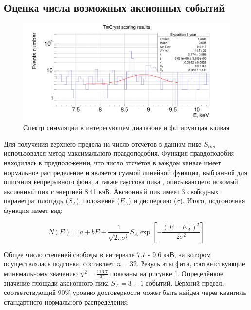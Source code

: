 \documentclass[a4paper,article,14pt]{extarticle}
\begin{document}
\subsection{Оценка числа возможных аксионных событий}

%
\begin{figure}[h!]
    \centering
    \includegraphics[width = \textwidth]{AxionFit.png}
    \caption{Спектр симуляции в интересующем диапазоне и фитирующая кривая}
   \label{AxionFit}
 \end{figure}
Для получения верхнего предела на число отсчётов в данном пике $S_{lim}$ использовался метод максимального правдоподобия. Функция правдоподобия находилась в предположении, что число отсчётов в каждом канале имеет нормальное распределение и является суммой линейной функции, выбранной для описания непрерывного фона, а также гауссова пика , описывающего искомый аксионный пик с энергией 8.41 кэВ. Аксионный пик имеет 3 свободных параметра: площадь ($S_A$), положение ($E_A$) и дисперсию ($\sigma$). Итого, подгоночная функция имеет вид:

\begin{equation}
    N\left( E \right) = a + bE + \frac{1}{{\sqrt {2\pi {\sigma ^2}} }} S_A\exp \left[ { - \frac{{{{\left( {E - {E_A}} \right)}^2}}}{{2{\sigma ^2}}}} \right]
\end{equation}

Общее число степеней свободы в интервале 7.7 - 9.6 кэВ, на котором осуществлялась подгонка, составляет $n = 32$. Результаты фита, соответствующие минимальному значению $\chi^2 = \frac{116.7}{32}$ показаны на рисунке \ref{AxionFit}. Определённое значение площади аксионного пика $S_A = 3 \pm 1$ событий. Верхний предел, соответствующий 90\% уровню достоверности может быть найден через квантиль стандартного нормального распределения:
\end{document}

